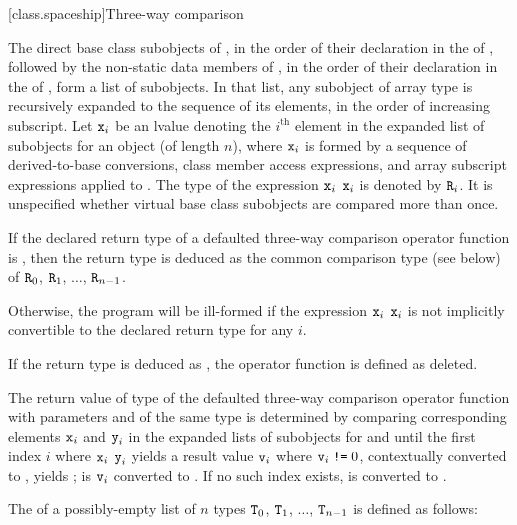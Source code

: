 [class.spaceship]{Three-way comparison}
%

\pnum
The direct base class subobjects of ,
in the order of their declaration in the  of ,
followed by the non-static data members of ,
in the order of their declaration in the  of ,
form a list of subobjects.
In that list, any subobject of array type is recursively expanded
to the sequence of its elements, in the order of increasing subscript.
Let $\texttt{x}_i$ be an lvalue denoting the $i^\text{th}$ element
in the expanded list of subobjects for an object 
(of length $n$),
where $\texttt{x}_i$ is
formed by a sequence of
derived-to-base conversions,
class member access expressions, and
array subscript expressions applied to .
The type of the expression $\texttt{x}_i$ \tcode{<=>} $\texttt{x}_i$
is denoted by $\texttt{R}_i$.
It is unspecified
whether virtual base class subobjects are compared more than once.

\pnum
If the declared return type
of a defaulted three-way comparison operator function
is ,
then the return type is deduced as
the common comparison type (see below) of
$\texttt{R}_0$, $\texttt{R}_1$, $\dotsc$, $\texttt{R}_{n-1}$.
\begin{note}
Otherwise,
the program will be ill-formed
if the expression $\texttt{x}_i$ \tcode{<=>} $\texttt{x}_i$
is not implicitly convertible to the declared return type for any $i$.
\end{note}
If the return type is deduced as ,
the operator function is defined as deleted.

\pnum
The return value  of type 
of the defaulted three-way comparison operator function
with parameters  and  of the same type
is determined by comparing corresponding elements
$\texttt{x}_i$ and $\texttt{y}_i$
in the expanded lists of subobjects for  and 
until the first index $i$
where $\texttt{x}_i$ \tcode{<=>} $\texttt{y}_i$
yields a result value $\texttt{v}_i$ where $\texttt{v}_i \mathrel{\texttt{!=}} 0$,
contextually converted to , yields ;
 is $\texttt{v}_i$ converted to .
If no such index exists,  is
 converted to .

\pnum
The  
of a possibly-empty list of $n$ types
$\texttt{T}_0$, $\texttt{T}_1$, $\dotsc$, $\texttt{T}_{n-1}$
is defined as follows:

